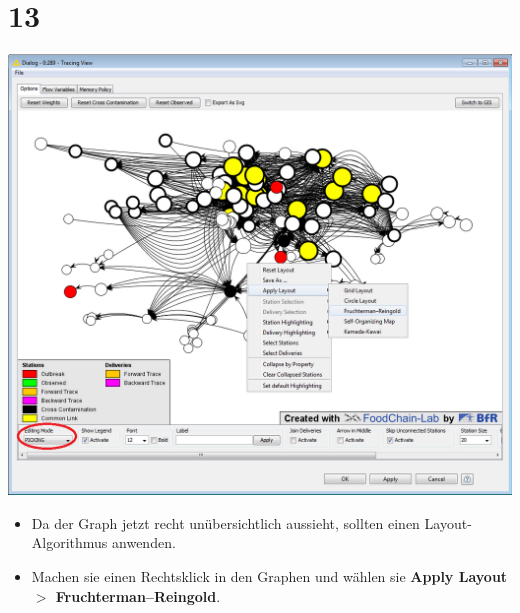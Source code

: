 \documentclass{beamer}
\begin{document}
\section{13}
\begin{frame}
	\begin{center}
  		\includegraphics[height=0.6\textheight]{13.png}
	\end{center}
	\begin{itemize}
		\item Da der Graph jetzt recht unübersichtlich aussieht, sollten einen Layout-Algorithmus anwenden.
		\item Machen sie einen Rechtsklick in den Graphen und wählen sie \textbf{Apply Layout $>$ Fruchterman–Reingold}.
	\end{itemize}
\end{frame}
\end{document}
